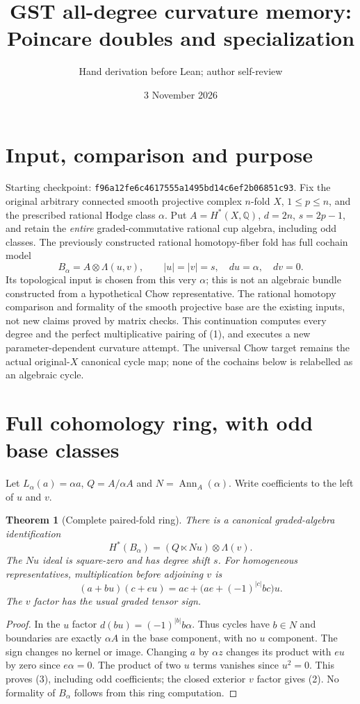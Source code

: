 \documentclass[11pt]{article}
\title{GST all-degree curvature memory: Poincare doubles and specialization}
\author{Hand derivation before Lean; author self-review}
\date{3 November 2026}
\newtheorem{theorem}{Theorem}
\newcommand{\Q}{\mathbb Q}
\newcommand{\Ann}{\operatorname{Ann}}
\begin{document}
\maketitle
\section{Input, comparison and purpose}
Starting checkpoint: \texttt{f96a12fe6c4617555a1495bd14c6ef2b06851c93}.
Fix the original arbitrary connected smooth projective complex $n$-fold $X$,
$1\le p\le n$, and the prescribed rational Hodge class $\alpha$.
Put $A=H^*(X,\Q)$, $d=2n$, $s=2p-1$, and retain the \emph{entire}
graded-commutative rational cup algebra, including odd classes.
The previously constructed rational homotopy-fiber fold has full cochain
model
\[
 B_\alpha=A\otimes\Lambda(u,v),\qquad |u|=|v|=s,
 \quad du=\alpha,\quad dv=0.                                      \tag{1}
\]
Its topological input is chosen from this very $\alpha$; this is not an
algebraic bundle constructed from a hypothetical Chow representative.
The rational homotopy comparison and formality of the smooth projective
base are the existing inputs, not new claims proved by matrix checks.
This continuation computes every degree and the perfect multiplicative
pairing of (1), and executes a new parameter-dependent curvature attempt.
The universal Chow target remains the actual original-$X$ canonical cycle
map; none of the cochains below is relabelled as an algebraic cycle.

\section{Full cohomology ring, with odd base classes}
Let $L_\alpha(a)=\alpha a$, $Q=A/\alpha A$ and $N=\Ann_A(\alpha)$.
Write coefficients to the left of $u$ and $v$.
\begin{theorem}[Complete paired-fold ring]\label{thm:ring}
There is a canonical graded-algebra identification
\[
 H^*(B_\alpha)=\left(Q\ltimes Nu\right)\otimes\Lambda(v).           \tag{2}
\]
The $Nu$ ideal is square-zero and has degree shift $s$.
For homogeneous representatives, multiplication before adjoining $v$ is
\[
 (a+bu)(c+eu)=ac+\bigl(ae+(-1)^{|c|}bc\bigr)u.                   \tag{3}
\]
The $v$ factor has the usual graded tensor sign.
\end{theorem}
\begin{proof}
In the $u$ factor $d(bu)=(-1)^{|b|}b\alpha$. Thus cycles have $b\in N$
and boundaries are exactly $\alpha A$ in the base component, with no
$u$ component. The sign changes no kernel or image. Changing $a$ by
$\alpha z$ changes its product with $eu$ by zero since $e\alpha=0$.
The product of two $u$ terms vanishes since $u^2=0$. This proves (3),
including odd coefficients; the closed exterior $v$ factor gives (2).
No formality of $B_\alpha$ follows from this ring computation.
\end{proof}
\end{document}
